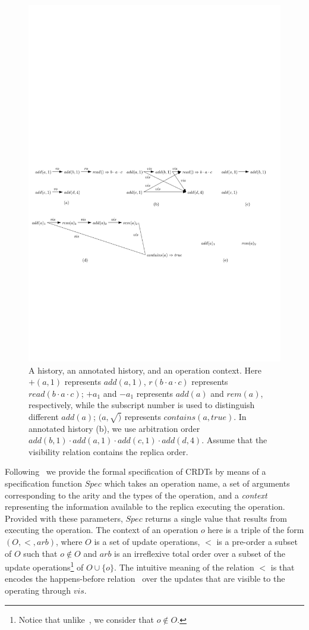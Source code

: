 \begin{figure}[t]
  \centering
  \includegraphics[width=0.75 \textwidth]{figures/PIC-his-anhis-context.pdf}
  \caption{A history, an annotated history, and an operation context. Here $+(a,1)$ represents $\mathit{add}(a,1)$, $r(b \cdot a \cdot c)$ represents $\mathit{read}(b \cdot a \cdot c)$; $+a_1$ and $-a_1$ represents $\mathit{add}(a)$ and $\mathit{rem}(a)$, respectively, while the subscript number is used to distinguish different $\mathit{add(a)}$; $(a,\surd)$ represents $\mathit{contains}(a,\mathit{true})$. In annotated history (b), we use arbitration order $\mathit{add}(b,1) \cdot \mathit{add}(a,1) \cdot \mathit{add}(c,1) \cdot \mathit{add}(d,4)$. Assume that the visibility relation contains the replica order.}
  \label{fig:history, annotated history and operation context}
\end{figure}


Following~\cite{Burkhardt:2014} we provide the formal specification of
CRDTs by means of a specification function $\mathit{Spec}$ which takes
an operation name, a set of arguments corresponding to the arity and
the types of the operation, and a \emph{context} representing the
information available to the replica executing the operation.
Provided with these parameters, $\mathit{Spec}$ returns a single value
that results from executing the operation.
%
The context of an operation $o$ here is a triple of the form
$(O,<,\mathit{arb})$, where $O$ is a set of update operations, $<$ is
a pre-order a subset of $O$ such that $o \notin O$ and $\mathit{arb}$
is an irreflexive total order over a subset of the update
operations\footnote{Notice that unlike~\cite{Burkhardt:2014}, we
  consider that $o \notin O$.} of $O \cup \{o\}$.
%
%
The intuitive meaning of the relation $<$ is that encodes the
happens-before relation~\cite{Lamport} over the updates that are
visible to the operating through $\mathit{vis}$.

